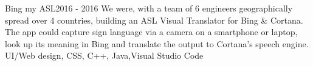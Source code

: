 %
%
%


\begin{projects}
	\project
	{Bing my ASL}{2016 - 2016}
	{  }
	{We were, with a team of 6 engineers geographically spread over 4 countries, building an ASL Visual Translator for Bing \& Cortana. The app could capture sign language via a camera on a smartphone or laptop, look up its meaning in Bing and translate the output to Cortana's speech engine.}
	{UI/Web design, CSS, C++, Java,Visual Studio Code}
\end{projects}